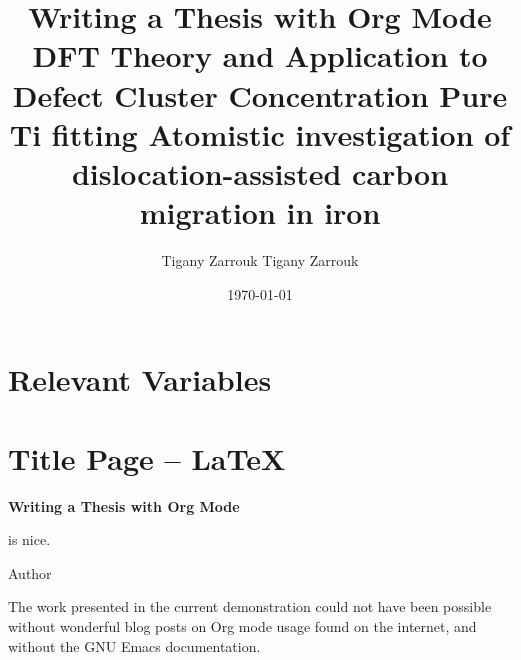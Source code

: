 \documentclass[a4paper,11pt]{article}
\author{Tigany Zarrouk Tigany Zarrouk}
\date{\today}
\title{Writing a Thesis with Org Mode DFT Theory and Application to Defect Cluster Concentration Pure Ti fitting Atomistic investigation of dislocation-assisted carbon migration in iron}
\numberwithin{equation}{chapter}
\numberwithin{listing}{chapter}
\newcommand{\ThesisTitle}{{Writing a Thesis with Org Mode}}
\newcommand{\ThesisSubTitle}{is nice.}
\newcommand{\AuthorShortName}{\mbox{Author}}
\begin{document}
\frontmatter

\section{Relevant Variables}
\label{sec:orgf47f5cc}

\section{Title Page -- \LaTeX{}}
\label{sec:org037c703}

\begin{titlepage}


  \cleardoublepage
  \pagestyle{empty}

  \begin{center}
    \null\vfill
    {\LARGE{\bfseries \ThesisTitle}\par}
    {\large \ThesisSubTitle \par}
    \vspace{\baselineskip}
    \vspace{\baselineskip}
    \vspace{\baselineskip}
    \vspace{\baselineskip}
    \vspace{\baselineskip}
    \vspace{\baselineskip}
    \vspace{\baselineskip}
    \vspace{\baselineskip}
    {\large\AuthorShortName}\\
    \vspace{\baselineskip}
    \vspace{\baselineskip}
    \vfill
  \end{center}

  \clearpage
  \null
  \noindent
  The work presented in the current demonstration could not have been possible without wonderful blog posts on Org mode usage found on the internet, and without the GNU Emacs documentation.


\end{titlepage}
\end{document}

